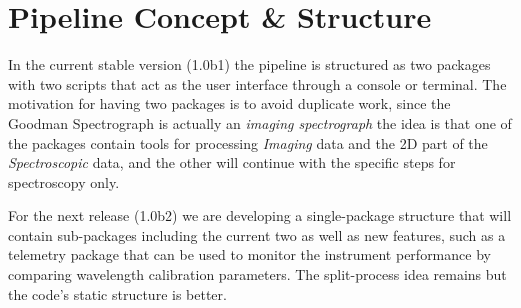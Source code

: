 \documentclass[11pt,twoside]{article}
\begin{document}
\section{Pipeline Concept \& Structure}

In the current stable version (1.0b1) the pipeline is structured as two packages
with two scripts that act as the user interface through a console or terminal.
The motivation for having two packages is to avoid duplicate work, since
the Goodman Spectrograph is actually an \emph{imaging spectrograph} the idea is
that one of the packages contain tools for processing \emph{Imaging} data and
the 2D part of the \emph{Spectroscopic} data, and the other will continue with
the specific steps for spectroscopy only.


% 
% 

For the next release (1.0b2) we are developing a single-package structure that will
contain sub-packages including the current two as well as new features, such as
a telemetry package that can be used to monitor the instrument performance by
comparing wavelength calibration parameters.
The split-process idea remains but the code's static structure is better.
\end{document}
